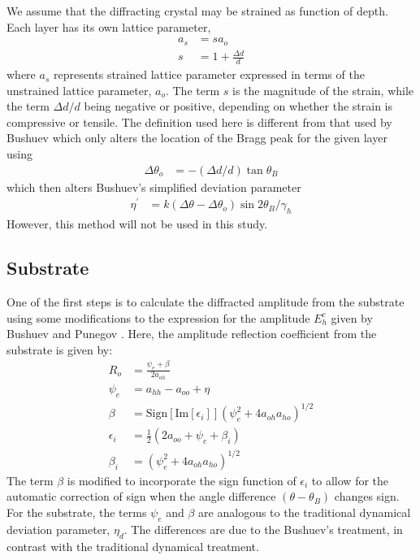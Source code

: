 We assume that the diffracting crystal may be strained as function of depth.  Each layer has its own lattice parameter,
\begin{align}
a_s &= s a_o\\
s &=1 + \frac{\Delta d}{d}
\end{align}
where $a_s$ represents strained lattice parameter expressed in terms of the unstrained lattice parameter, $a_o$.  The term $s$ is the magnitude of the strain, while the term $\Delta d/d$ being negative or positive, depending on whether the strain is compressive or tensile.  The definition used here is different from that used by Bushuev \cite{Bushuev1} which only alters the location of the Bragg peak for the given layer using
\begin{align}
\Delta \theta_o &= -(\Delta d/d) \tan \theta_B
\end{align}
which then alters Bushuev's simplified deviation parameter
\begin{align}
\eta^\prime &= k (\Delta \theta - \Delta \theta_o) \sin 2\theta_B/\gamma_h
\end{align}
However, this method will not be used in this study.

		\subsection{Substrate}

One of the first steps is to calculate the diffracted amplitude from the substrate using some modifications to the expression for the amplitude $E^c_h$ given by Bushuev \cite{Bushuev1} and Punegov \cite{Punegov15}. Here, the amplitude reflection coefficient from the substrate is given by:
\begin{align}
R_o &= \frac{\psi_e + \beta}{2a_{oh}}\\
\psi_e &= a_{hh} -a_{oo} + \eta \\
\beta&=\text{Sign}[\text{Im}[\epsilon_i]](\psi_e^2 + 4 a_{oh} a_{ho})^{1/2}\label{sign}\\
\epsilon_i&= \frac{1}{2} (2 a_{oo} + \psi_e + \beta_i)\\
\beta_i&=(\psi_e^2 + 4 a_{oh} a_{ho})^{1/2}
\end{align}
The term $\beta$ is modified to incorporate the sign function of $\epsilon_i$ to allow for the automatic correction of sign when the angle difference $(\theta-\theta_B)$ changes sign. For the substrate, the terms $\psi_e$ and $\beta$ are analogous to the traditional dynamical deviation parameter, $\eta_d$.  The differences are due to the Bushuev's treatment, in contrast with the traditional dynamical treatment.  

